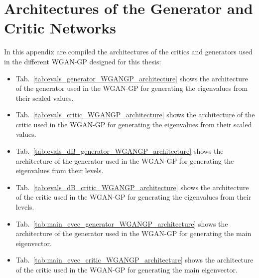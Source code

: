 \documentclass[11pt,a4paper,twoside]{report}
\begin{document}
\cleardoublepage

\appendix
\fancyhead[LO]{\rightmark}
\fancyhead[RO]{\scshape\appendixname\ \thechapter}
\fancyhead[LE]{\scshape\appendixname\ \thechapter}
\fancyhead[RE]{\textsc{\leftmark}}


\chapter[Architectures of the Different Networks]{Architectures of the Generator and Critic Networks}

In this appendix are compiled the architectures of the critics and generators used in the different WGAN-GP designed for this thesis:

\begin{itemize}
    \item Tab.~\ref{tab:evals_generator_WGANGP_architecture} shows the architecture of the generator used in the WGAN-GP for generating the eigenvalues from their scaled values.
    \item Tab.~\ref{tab:evals_critic_WGANGP_architecture} shows the architecture of the critic used in the WGAN-GP for generating the eigenvalues from their scaled values.
    \item Tab.~\ref{tab:evals_dB_generator_WGANGP_architecture} shows the architecture of the generator used in the WGAN-GP for generating the eigenvalues from their levels.
    \item Tab.~\ref{tab:evals_dB_critic_WGANGP_architecture} shows the architecture of the critic used in the WGAN-GP for generating the eigenvalues from their levels.
    \item Tab.~\ref{tab:main_evec_generator_WGANGP_architecture} shows the architecture of the generator used in the WGAN-GP for generating the main eigenvector.
    \item Tab.~\ref{tab:main_evec_critic_WGANGP_architecture} shows the architecture of the critic used in the WGAN-GP for generating the main eigenvector.
\end{itemize}
\end{document}
